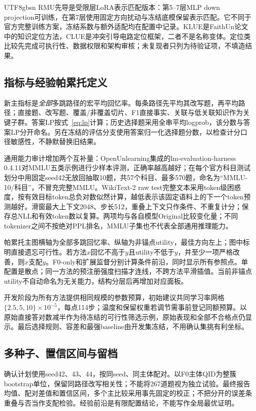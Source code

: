 \documentclass[sigconf,anonymous,review]{acmart}
\begin{document}
\begin{CJK*}{UTF8}{gbsn}
RMU先导是受限层LoRA表示匹配版本：第5--7层MLP down projection可训练，在第7层使用固定方向扰动与冻结底模保留表示匹配。它不同于官方完整训练方案，冻结系数与额外适配均在配置中记录。KLUE是FaithUn论文中的知识定位方法\cite{faithun}，CLUE是冲突引导电路定位框架\cite{clue}，二者不是名称变体。定位类比较先完成可执行性、数据权限和架构审核；未复现者只列为待验证项，不填造结果。

\subsection{指标与经验帕累托定义}
新主指标是\emph{全部}多跳路径的宏平均回忆率。每条路径先平均其改写题，再平均路径；直接题、改写题、覆盖/非覆盖切片、F1直接事实、关联与低关联知识作为关键子群。答案LP按式~\eqref{eq:lp}计算；历史选择题采用全串平均logprob，该分数与答案LP分开命名。另在冻结的评估分支使用答案归一化选择题分数，以检查计分口径敏感性，不静默替换旧结果。

通用能力审计增加两个互补量：OpenUnlearning集成的lm-evaluation-harness 0.4.11对MMLU五类示例进行少样本评测，正确率越高越好；在每个官方科目测试划分中用固定seed42无放回抽取10题，共57个科目、最多570题，命名为“MMLU-10/科目”，不冒充完整MMLU。WikiText-2 raw test完整文本采用token级困惑度，按有效目标token总负对数似然计算，越低表示该固定语料上的下一个token预测越好。滑窗最大上下文2048、步长512，重叠上下文只作条件、不重复计分；保存总NLL和有效token数以复算。两项均与各自模型Original比较变化量；不同tokenizer之间不按绝对PPL排名，MMLU子集也不代表全部通用推理能力。

帕累托主图横轴为全部多跳回忆率、纵轴为非锚点utility，最佳方向左上；图中标明直接遗忘可行性。若方法$x$回忆不高于$y$且utility不低于$y$，并至少一项严格改善，则$x$支配$y$。F0-only和扩展监督分别计算条件前沿，同时显示所有参照点。单配置是散点；同一方法的预注册强度扫描才连线，不跨方法平滑插值。当前非锚点utility不自动命名为无关能力，结构分层后再增加对应面板。

开发阶段为所有方法提供相同规模的参数预算，初始建议共同学习率网格$\{2.5,5,10\}\times10^{-5}$，每点114步；温度和保留权重若调节需事前登记同额预算。以原始直接答对数减半作为待冻结的可行性筛选示例，原始表现和全部不合格点仍显示。最后选择规则、容差和最强baseline由开发集冻结，不用确认集挑有利坐标。

\subsection{多种子、置信区间与留档}
确认计划使用seed42、43、44，按同seed、同主体配对。以F0主体QID为整簇bootstrap单位，保留同路径改写相关性；不能将267道题视为独立试验。最终报告均值、配对差值和置信区间，多个主比较采用事先固定的校正；不把分开的误差条重叠与否当作支配检验。经验前沿是有限配置结论，不能写作全局最优证明。


\end{CJK*}
\end{document}
